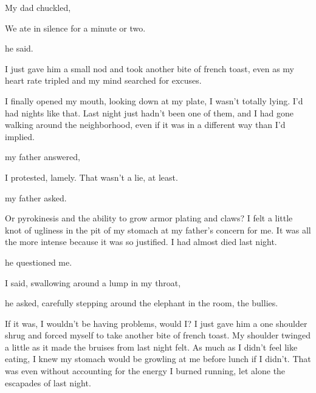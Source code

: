 My dad chuckled, 


We ate in silence for a minute or two.

 he said.

I just gave him a small nod and took another bite of french toast, even as my heart rate tripled and my mind searched for excuses.

 I finally opened my mouth, looking down at my plate,  I wasn't totally lying. I'd had nights like that. Last night just hadn't been one of them, and I had gone walking around the neighborhood, even if it was in a different way than I'd implied.

 my father answered, 

 I protested, lamely. That wasn't a lie, at least.

 my father asked.

Or pyrokinesis and the ability to grow armor plating and claws? I felt a little knot of ugliness in the pit of my stomach at my father's concern for me. It was all the more intense because it was so justified. I had almost died last night.

 he questioned me.

 I said, swallowing around a lump in my throat, 

 he asked, carefully stepping around the elephant in the room, the bullies.

If it was, I wouldn't be having problems, would I? I just gave him a one shoulder shrug and forced myself to take another bite of french toast. My shoulder twinged a little as it made the bruises from last night felt. As much as I didn't feel like eating, I knew my stomach would be growling at me before lunch if I didn't. That was even without accounting for the energy I burned running, let alone the escapades of last night.


